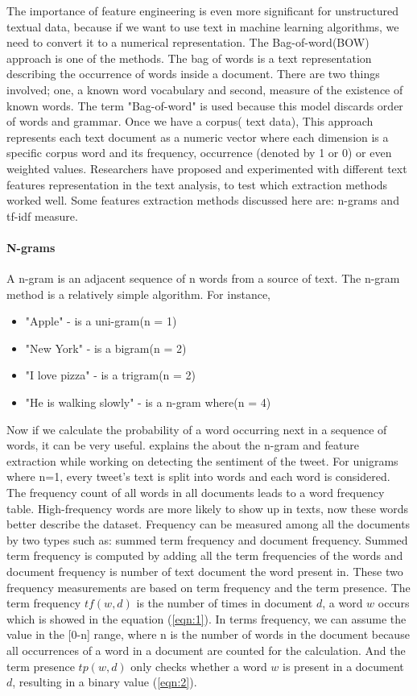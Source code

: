 The importance of feature engineering is even more significant for unstructured textual data, because if we want to use text in machine learning algorithms, we need to convert it to a numerical representation. The Bag-of-word(BOW) approach is one of the methods. The bag of words is a text representation describing the occurrence of words inside a document. There are two things involved; one, a known word vocabulary and second, measure of the existence of known words. The term "Bag-of-word" is used because this model discards order of words and grammar.  Once we have a corpus( text data), This approach represents each text document as a numeric vector where each dimension is a specific corpus word and its frequency, occurrence (denoted by 1 or 0) or even weighted values. Researchers have proposed and experimented with different text features representation in the text analysis, to test which extraction methods worked well. Some features extraction methods discussed here are:  n-grams and tf-idf measure.

\paragraph{N-grams} 


A n-gram is an adjacent sequence of n words from a source of text. The n-gram method is a relatively simple algorithm. For instance, 
\begin{itemize}
  \item "Apple" - is a uni-gram(n = 1)
  \item "New York" - is a bigram(n = 2)
  \item "I love pizza" - is a trigram(n = 2)
  \item "He is walking slowly" - is a n-gram where(n = 4)
\end{itemize}
Now if we calculate the probability of a word occurring next in a sequence of words, it can be very useful. \cite{groot2012data} explains the about the n-gram and feature extraction while working on detecting the sentiment of the tweet. For unigrams where n=1, every tweet's text is split into words and each word is considered. The frequency count of all words in all documents leads to a word frequency table. High-frequency words are more likely to show up in texts, now these words better describe the dataset. Frequency can be measured among all the documents by two types such as: summed term frequency and document frequency. Summed term frequency is computed by adding all the term frequencies of the words and document frequency is number of text document the word present in. These two frequency measurements are based on term frequency and the term presence. The term frequency $tf(w,d)$ is the number of times in document $d$, a word $w$ occurs which is showed in the equation (\ref{eqn:1}). In terms frequency, we can assume the value in the [0-n] range, where n is the number of words in the document because all occurrences of a word in a document are counted for the calculation. And the term presence $tp(w,d)$ only checks whether a word $w$ is present in a document $d$, resulting in a binary value (\ref{eqn:2}).

